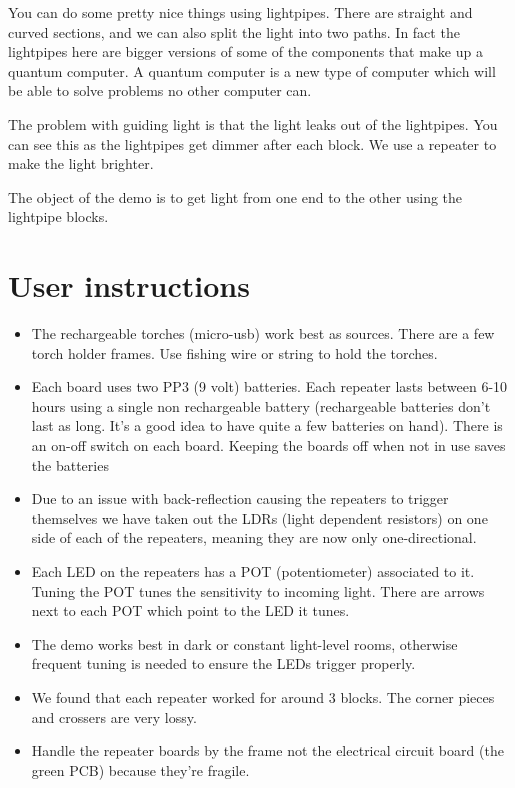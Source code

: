 \documentclass[12pt]{article}
\begin{document}
You can do some pretty nice things using lightpipes. There are straight and curved sections, and we can also split the light into two paths. In fact the lightpipes here are bigger versions of some of the components that make up a quantum computer. A quantum computer is a new type of computer which will be able to solve problems no other computer can.

The problem with guiding light is that the light leaks out of the lightpipes. You can see this as the lightpipes get dimmer after each block. We use a repeater to make the light brighter.  

The object of the demo is to get light from one end to the other using the lightpipe blocks.

\section{User instructions}

\begin{itemize}
    \item The rechargeable torches (micro-usb) work best as sources. There are a few torch holder
        frames. Use fishing wire or string to hold the torches.
    \item Each board uses two PP3 (9 volt) batteries. Each repeater lasts between 6-10 hours using a single non rechargeable battery (rechargeable batteries don't last as long. It's a good idea to have quite a few batteries on hand). There is an on-off switch on each board. Keeping the boards off when not in use saves the batteries
    \item Due to an issue with back-reflection causing the repeaters to trigger
      themselves we have taken out the LDRs (light dependent resistors) on one side of each of
        the repeaters, meaning they are now only one-directional.
    \item Each LED on the repeaters has a POT (potentiometer) associated to it. Tuning
        the POT tunes the sensitivity to incoming light. There are arrows next to each
        POT which point to the LED it tunes.
    \item The demo works best in dark or constant light-level rooms, otherwise frequent
        tuning is needed to ensure the LEDs trigger properly.
    \item We found that each repeater worked for around 3 blocks. The corner pieces and
      crossers are very lossy.
    \item Handle the repeater boards by the frame not the electrical circuit board (the green PCB) because they're fragile.
\end{itemize}
\end{document}
